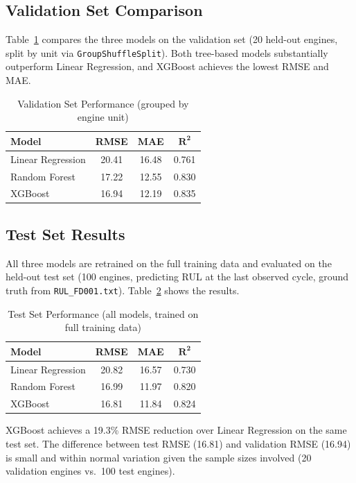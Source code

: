 \documentclass[11pt, a4paper]{article}
\begin{document}
\subsection{Validation Set Comparison}

Table~\ref{tab:val_results} compares the three models on the validation set (20 held-out engines, split by unit via \texttt{GroupShuffleSplit}). Both tree-based models substantially outperform Linear Regression, and XGBoost achieves the lowest RMSE and MAE.

\begin{table}[H]
\centering
\caption{Validation Set Performance (grouped by engine unit)}
\label{tab:val_results}
\begin{tabular}{lccc}
\toprule
\textbf{Model} & \textbf{RMSE} & \textbf{MAE} & $\boldsymbol{R^2}$ \\
\midrule
Linear Regression & 20.41 & 16.48 & 0.761 \\
Random Forest     & 17.22 & 12.55 & 0.830 \\
XGBoost           & 16.94 & 12.19 & 0.835 \\
\bottomrule
\end{tabular}
\end{table}

\subsection{Test Set Results}

All three models are retrained on the full training data and evaluated on the held-out test set (100 engines, predicting RUL at the last observed cycle, ground truth from \texttt{RUL\_FD001.txt}). Table~\ref{tab:test_results} shows the results.

\begin{table}[H]
\centering
\caption{Test Set Performance (all models, trained on full training data)}
\label{tab:test_results}
\begin{tabular}{lccc}
\toprule
\textbf{Model} & \textbf{RMSE} & \textbf{MAE} & $\boldsymbol{R^2}$ \\
\midrule
Linear Regression & 20.82 & 16.57 & 0.730 \\
Random Forest     & 16.99 & 11.97 & 0.820 \\
XGBoost           & 16.81 & 11.84 & 0.824 \\
\bottomrule
\end{tabular}
\end{table}

XGBoost achieves a 19.3\% RMSE reduction over Linear Regression on the same test set. The difference between test RMSE (16.81) and validation RMSE (16.94) is small and within normal variation given the sample sizes involved (20 validation engines vs.\ 100 test engines).
\end{document}
